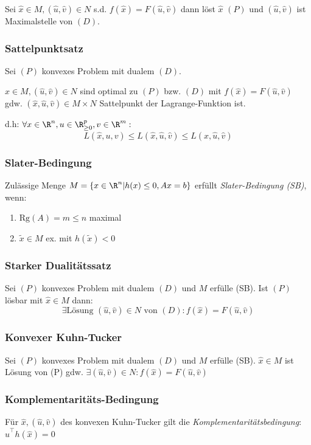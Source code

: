 Sei \(\hat x \in M, (\hat u, \hat v) \in N\) s.d. \(f(\hat x) = F(\hat u, \hat v)\) dann löst \(\hat x\) \((P)\) und \((\hat u, \hat v)\) ist Maximalstelle von \((D)\).

\subsubsection*{Sattelpunktsatz}

Sei \((P)\) konvexes Problem mit dualem \((D)\).

\(\hat x \in M, (\hat u, \hat v) \in N\) sind optimal zu \((P)\) bzw. \((D)\) mit \(f(\hat x) = F(\hat u, \hat v)\) gdw. \((\hat x, \hat u, \hat v) \in M \times N\) Sattelpunkt der Lagrange-Funktion ist.

d.h: \(\forall x \in \R^n, u \in \R_{\geq 0}^p, v \in \R^m :\) \[L(\hat x,u,v) \leq L(\hat x,\hat u,\hat v) \leq L(x,\hat u,\hat v)\]

\subsubsection*{Slater-Bedingung}

Zulässige Menge \(M = \{x \in \R^n | h(x) \leq 0, Ax=b\}\) erfüllt \emph{Slater-Bedingung (SB)}, wenn:

\begin{enumerate}[label=(\roman*)]
	\item \(\text{Rg}(A) = m \leq n\) maximal
	\item \(\tilde x \in M\) ex. mit \(h(\tilde x) < 0\)
\end{enumerate}

\subsubsection*{Starker Dualitätssatz}

Sei \((P)\) konvexes Problem mit dualem \((D)\) und \(M\) erfülle (SB). Ist \((P)\) lösbar mit \(\hat x \in M\) dann:
\[\exists \text{Lösung } (\hat u,\hat v) \in N \text{ von } (D) : f(\hat x) = F(\hat u,\hat v)\]

\subsubsection*{Konvexer Kuhn-Tucker}

Sei \((P)\) konvexes Problem mit dualem \((D)\) und \(M\) erfülle (SB).
\(\hat x \in M\) ist Lösung von (P) gdw. \(\exists (\hat u,\hat v) \in N : f(\hat x) = F(\hat u,\hat v)\)

\subsubsection*{Komplementaritäts-Bedingung}

Für \(\hat x, (\hat u,\hat v)\) des konvexen Kuhn-Tucker gilt die \emph{Komplementaritätsbedingung}: \(\hat u^\top h(\hat x) = 0\)

